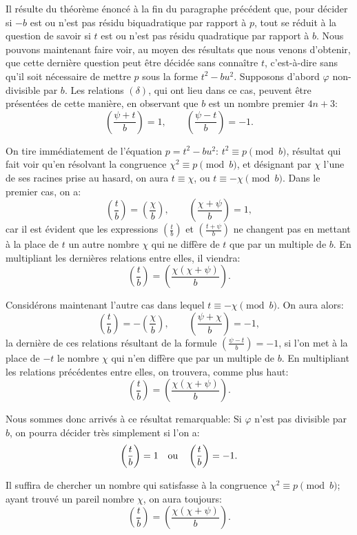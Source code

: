 \documentclass[11pt]{article}
\newcommand{\leg}[2]{\left(\frac{#1}{#2}\right)}
\newcommand{\unitid}[1]{\hypertarget{#1}{}}
\begin{document}
\unitid{dirichlet.v1.p04b.par.005}Il résulte du théorème énoncé à la fin du paragraphe précédent que, pour décider si $-b$ est ou n'est pas résidu biquadratique par rapport à $p$, tout se réduit à la question de savoir si $t$ est ou n'est pas résidu quadratique par rapport à $b$. Nous pouvons maintenant faire voir, au moyen des résultats que nous venons d'obtenir, que cette dernière question peut être décidée sans connaître $t$, c'est-à-dire sans qu'il soit nécessaire de mettre $p$ sous la forme $t^2-bu^2$. Supposons d'abord $\varphi$ non-divisible par $b$. Les relations $(\delta)$, qui ont lieu dans ce cas, peuvent être présentées de cette manière, en observant que $b$ est un nombre premier $4n+3$:
\unitid{dirichlet.v1.p04b.eq.006}
\[
\leg{\psi+t}{b}=1,\qquad \leg{\psi-t}{b}=-1.
\]

\unitid{dirichlet.v1.p04b.par.006}On tire immédiatement de l'équation $p=t^2-bu^2$: $t^2\equiv p\pmod b$, résultat qui fait voir qu'en résolvant la congruence $\chi^2\equiv p\pmod b$, et désignant par $\chi$ l'une de ses racines prise au hasard, on aura $t\equiv\chi$, ou $t\equiv-\chi\pmod b$. Dans le premier cas, on a:
\unitid{dirichlet.v1.p04b.eq.007}
\[
\leg{t}{b}=\leg{\chi}{b},\qquad \leg{\chi+\psi}{b}=1,
\]
car il est évident que les expressions $\leg{t}{b}$ et $\leg{t+\psi}{b}$ ne changent pas en mettant à la place de $t$ un autre nombre $\chi$ qui ne diffère de $t$ que par un multiple de $b$. En multipliant les dernières relations entre elles, il viendra:
\unitid{dirichlet.v1.p04b.eq.008}
\[
\leg{t}{b}=\leg{\chi(\chi+\psi)}{b}.
\]

\unitid{dirichlet.v1.p04b.par.007}Considérons maintenant l'autre cas dans lequel $t\equiv-\chi\pmod b$. On aura alors:
\unitid{dirichlet.v1.p04b.eq.009}
\[
\leg{t}{b}=-\leg{\chi}{b},\qquad \leg{\psi+\chi}{b}=-1,
\]
la dernière de ces relations résultant de la formule $\leg{\psi-t}{b}=-1$, si l'on met à la place de $-t$ le nombre $\chi$ qui n'en diffère que par un multiple de $b$. En multipliant les relations précédentes entre elles, on trouvera, comme plus haut:
\unitid{dirichlet.v1.p04b.eq.010}
\[
\leg{t}{b}=\leg{\chi(\chi+\psi)}{b}.
\]

\unitid{dirichlet.v1.p04b.par.008}Nous sommes donc arrivés à ce résultat remarquable: Si $\varphi$ n'est pas divisible par $b$, on pourra décider très simplement si l'on a:
\unitid{dirichlet.v1.p04b.eq.011}
\[
\leg{t}{b}=1\quad\hbox{ou}\quad \leg{t}{b}=-1.
\]

\unitid{dirichlet.v1.p04b.par.009}Il suffira de chercher un nombre qui satisfasse à la congruence $\chi^2\equiv p\pmod b$; ayant trouvé un pareil nombre $\chi$, on aura toujours:
\unitid{dirichlet.v1.p04b.eq.012}
\[
\leg{t}{b}=\leg{\chi(\chi+\psi)}{b}.
\]
\end{document}

